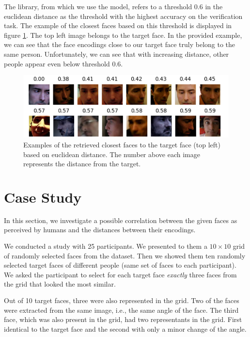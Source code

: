 The library, from which we use the model, refers to a threshold 0.6 in the euclidean distance as the threshold with the highest accuracy on the verification task. The example of the closest faces based on this threshold is displayed in figure \ref{fig:closest_faces}. The top left image belongs to the target face. In the provided example, we can see that the face encodings close to our target face truly belong to the same person. Unfortunately, we can see that with increasing distance, other people appear even below threshold 0.6.


\begin{figure}
    \centering
    \includegraphics[width=\linewidth]{img/man_closest_faces.pdf}
    \caption[Examples of the retrieved closest faces to the target face based on euclidean distance]{Examples of the retrieved closest faces to the target face (top left) based on euclidean distance. The number above each image represents the distance from the target.}
    \label{fig:closest_faces}
\end{figure}

\section{Case Study}
\label{s:case_study}

In this section, we investigate a possible correlation between the given faces as perceived by humans and the distances between their encodings.

We conducted a study with 25 participants. We presented to them a $10\times10$ grid of randomly selected faces from the dataset. 
Then we showed them ten randomly selected target faces of different people (same set of faces to each participant). We asked the participant to select for each target face \emph{exactly} three faces from the grid that looked the most similar. 

Out of 10 target faces, three were also represented in the grid. Two of the faces were extracted from the same image, i.e., the same angle of the face. The third face, which was also present in the grid, had two representants in the grid. First identical to the target face and the second with only a minor change of the angle.

